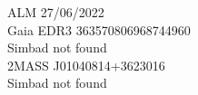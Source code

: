 ALM 27/06/2022\\
Gaia EDR3 363570806968744960\\
Simbad not found\\
2MASS J01040814+3623016\\
Simbad not found\\


